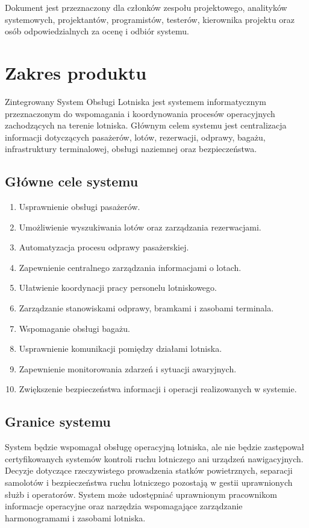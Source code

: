 \documentclass[12pt,a4paper,oneside]{report}
\begin{document}
Dokument jest przeznaczony dla członków zespołu projektowego, analityków systemowych, projektantów, programistów, testerów, kierownika projektu oraz osób odpowiedzialnych za ocenę i odbiór systemu.

\section{Zakres produktu}
Zintegrowany System Obsługi Lotniska jest systemem informatycznym przeznaczonym do wspomagania i koordynowania procesów operacyjnych zachodzących na terenie lotniska. Głównym celem systemu jest centralizacja informacji dotyczących pasażerów, lotów, rezerwacji, odprawy, bagażu, infrastruktury terminalowej, obsługi naziemnej oraz bezpieczeństwa.

\subsection*{Główne cele systemu}
\begin{enumerate}
    \item Usprawnienie obsługi pasażerów.
    \item Umożliwienie wyszukiwania lotów oraz zarządzania rezerwacjami.
    \item Automatyzacja procesu odprawy pasażerskiej.
    \item Zapewnienie centralnego zarządzania informacjami o lotach.
    \item Ułatwienie koordynacji pracy personelu lotniskowego.
    \item Zarządzanie stanowiskami odprawy, bramkami i zasobami terminala.
    \item Wspomaganie obsługi bagażu.
    \item Usprawnienie komunikacji pomiędzy działami lotniska.
    \item Zapewnienie monitorowania zdarzeń i sytuacji awaryjnych.
    \item Zwiększenie bezpieczeństwa informacji i operacji realizowanych w systemie.
\end{enumerate}

\subsection*{Granice systemu}
System będzie wspomagał obsługę operacyjną lotniska, ale nie będzie zastępował certyfikowanych systemów kontroli ruchu lotniczego ani urządzeń nawigacyjnych. Decyzje dotyczące rzeczywistego prowadzenia statków powietrznych, separacji samolotów i bezpieczeństwa ruchu lotniczego pozostają w gestii uprawnionych służb i operatorów. System może udostępniać uprawnionym pracownikom informacje operacyjne oraz narzędzia wspomagające zarządzanie harmonogramami i zasobami lotniska.
\end{document}
